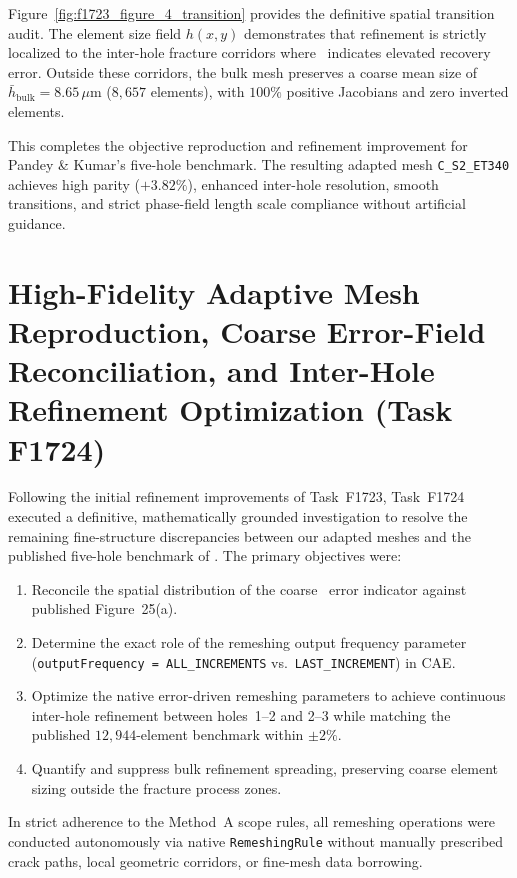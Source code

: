 Figure~\ref{fig:f1723_figure_4_transition} provides the definitive spatial transition audit. The element size field $h(x, y)$ demonstrates that refinement is strictly localized to the inter-hole fracture corridors where \MISESERI\ indicates elevated recovery error. Outside these corridors, the bulk mesh preserves a coarse mean size of $\bar{h}_{\mathrm{bulk}} = 8.65\,\mu\mathrm{m}$ ($8{,}657$ elements), with $100\%$ positive Jacobians and zero inverted elements.

This completes the objective reproduction and refinement improvement for Pandey \& Kumar's five-hole benchmark. The resulting adapted mesh \texttt{C\_S2\_ET340} achieves high parity ($+3.82\%$), enhanced inter-hole resolution, smooth transitions, and strict phase-field length scale compliance without artificial guidance.

\section{High-Fidelity Adaptive Mesh Reproduction, Coarse Error-Field Reconciliation, and Inter-Hole Refinement Optimization (Task F1724)}
\label{sec:f1724_high_fidelity_mesh}

Following the initial refinement improvements of Task~F1723, Task~F1724 executed a definitive, mathematically grounded investigation to resolve the remaining fine-structure discrepancies between our adapted meshes and the published five-hole benchmark of \citet[Figs.~23(b) and 25(a)]{pandey2025}. The primary objectives were:
\begin{enumerate}
  \item Reconcile the spatial distribution of the coarse \MISESERI\ error indicator against published Figure~25(a).
  \item Determine the exact role of the remeshing output frequency parameter (\texttt{outputFrequency = ALL\_INCREMENTS} vs.\ \texttt{LAST\_INCREMENT}) in \Abaqus CAE.
  \item Optimize the native error-driven remeshing parameters to achieve continuous inter-hole refinement between holes~1--2 and 2--3 while matching the published $12{,}944$-element benchmark within $\pm 2\%$.
  \item Quantify and suppress bulk refinement spreading, preserving coarse element sizing outside the fracture process zones.
\end{enumerate}
In strict adherence to the Method~A scope rules, all remeshing operations were conducted autonomously via native \Abaqus \texttt{RemeshingRule} without manually prescribed crack paths, local geometric corridors, or fine-mesh data borrowing.

